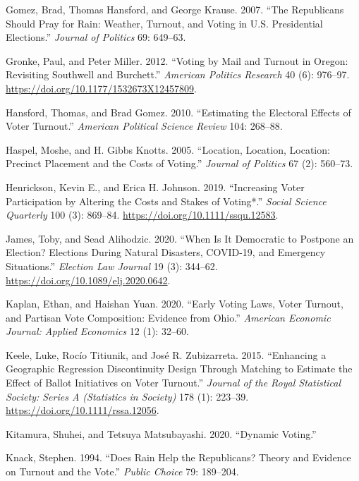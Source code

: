 \documentclass[
  12pt,
]{article}
\newlength{\cslhangindent}
\newenvironment{cslreferences}%
  {\setlength{\parindent}{0pt}%
  \everypar{\setlength{\hangindent}{\cslhangindent}}\ignorespaces}%
  {\par}
\begin{document}
\begin{cslreferences}
\leavevmode\hypertarget{ref-Gomez2007}{}%
Gomez, Brad, Thomas Hansford, and George Krause. 2007. ``The Republicans Should Pray for Rain: Weather, Turnout, and Voting in U.S. Presidential Elections.'' \emph{Journal of Politics} 69: 649--63.

\leavevmode\hypertarget{ref-Gronke2012}{}%
Gronke, Paul, and Peter Miller. 2012. ``Voting by Mail and Turnout in Oregon: Revisiting Southwell and Burchett.'' \emph{American Politics Research} 40 (6): 976--97. \url{https://doi.org/10.1177/1532673X12457809}.

\leavevmode\hypertarget{ref-Hansford2010}{}%
Hansford, Thomas, and Brad Gomez. 2010. ``Estimating the Electoral Effects of Voter Turnout.'' \emph{American Political Science Review} 104: 268--88.

\leavevmode\hypertarget{ref-Haspel2005}{}%
Haspel, Moshe, and H. Gibbs Knotts. 2005. ``Location, Location, Location: Precinct Placement and the Costs of Voting.'' \emph{Journal of Politics} 67 (2): 560--73.

\leavevmode\hypertarget{ref-Henrickson2019}{}%
Henrickson, Kevin E., and Erica H. Johnson. 2019. ``Increasing Voter Participation by Altering the Costs and Stakes of Voting*.'' \emph{Social Science Quarterly} 100 (3): 869--84. \url{https://doi.org/10.1111/ssqu.12583}.

\leavevmode\hypertarget{ref-James2020}{}%
James, Toby, and Sead Alihodzic. 2020. ``When Is It Democratic to Postpone an Election? Elections During Natural Disasters, COVID-19, and Emergency Situations.'' \emph{Election Law Journal} 19 (3): 344--62. \url{https://doi.org/10.1089/elj.2020.0642}.

\leavevmode\hypertarget{ref-Kaplan2020}{}%
Kaplan, Ethan, and Haishan Yuan. 2020. ``Early Voting Laws, Voter Turnout, and Partisan Vote Composition: Evidence from Ohio.'' \emph{American Economic Journal: Applied Economics} 12 (1): 32--60.

\leavevmode\hypertarget{ref-Keele2015a}{}%
Keele, Luke, Rocío Titiunik, and José R. Zubizarreta. 2015. ``Enhancing a Geographic Regression Discontinuity Design Through Matching to Estimate the Effect of Ballot Initiatives on Voter Turnout.'' \emph{Journal of the Royal Statistical Society: Series A (Statistics in Society)} 178 (1): 223--39. \url{https://doi.org/10.1111/rssa.12056}.

\leavevmode\hypertarget{ref-Kitamura2020}{}%
Kitamura, Shuhei, and Tetsuya Matsubayashi. 2020. ``Dynamic Voting.''

\leavevmode\hypertarget{ref-Knack1994}{}%
Knack, Stephen. 1994. ``Does Rain Help the Republicans? Theory and Evidence on Turnout and the Vote.'' \emph{Public Choice} 79: 189--204.


\end{cslreferences}
\end{document}
